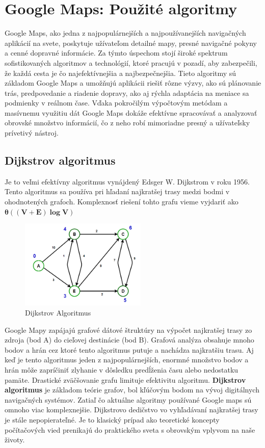 \documentclass[10pt,slovak,a4paper]{article}
\begin{document}
\section{Google Maps: Použité algoritmy}
Google Maps, ako jedna z najpopulárnejších a najpoužívanejších navigačných aplikácií na svete, poskytuje užívateľom detailné mapy, presné navigačné pokyny a cenné dopravné informácie. Za týmto úspechom stojí široké spektrum sofistikovaných algoritmov a technológií, ktoré pracujú v pozadí, aby zabezpečili, že každá cesta je čo najefektívnejšia a najbezpečnejšia.
\cite{Algoritmy} Tieto algoritmy sú základom Google Maps a umožňujú aplikácii riešiť rôzne výzvy, ako sú plánovanie trás, predpovedanie a riadenie dopravy, ako aj rýchla adaptácia na meniace sa podmienky v reálnom čase. Vďaka pokročilým výpočtovým metódam a masívnemu využitiu dát Google Maps dokáže efektívne spracovávať a analyzovať obrovské množstvo informácií, čo z neho robí mimoriadne presný a užívateľsky prívetivý nástroj.
\subsection{Dijkstrov algoritmus}
Je to veľmi efektívny algoritmus vynájdený Edsger W. Dijkstrom v roku 1956. \cite{Djikstra's} Tento algoritmus sa používa pri hľadaní najkratšej trasy medzi bodmi v ohodnotených grafoch. Komplexnosť riešení tohto grafu vieme vyjdariť ako $\boldsymbol{\theta((V + E) \log V)}$

\begin{figure} [h]
 \centering
 \includegraphics[width=6cm]{dijkstra}
\caption{Dijkstrov Algoritmus}

\end{figure}

Google Mapy zapájajú grafové dátové štruktúry na výpočet najkratšej trasy zo zdroja (bod A) do cieľovej destinácie (bod B). Grafová analýza obsahuje mnoho bodov a hrán cez ktoré tento algoritmus putuje a nachádza najkratšiu trasu. Aj keď je tento algoritmus jeden z najpopulárnejších, enormné množstvo bodov a hrán môže zapríčiniť zlyhanie v dôsledku predĺženia času alebo nedostatku pamäte. Drastické zväčšovanie grafu limituje efektivitu algoritmu.
\cite{Algoritmy2}
\textbf{Dijkstrov algoritmus} je základom teórie grafov, bol kľúčovým bodom na vývoj digitálnych navigačných systémov. Zatiaľ čo aktuálne algoritmy používané Google maps sú omnoho viac komplexnejšie. Dijkstrovo dedičstvo vo vyhľadávaní najkratšej trasy je stále nepopierateľné. Je to klasický prípad ako teoretické koncepty počítačových vied prenikajú do praktického sveta s obrovským vplyvom na naše životy.
\end{document}
